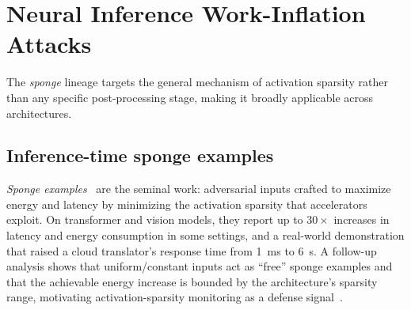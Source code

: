 \documentclass[acmsmall,screen,review,nonacm]{acmart}
\begin{document}

\section{Neural Inference Work-Inflation Attacks}
\label{sec:sponge}

The \emph{sponge} lineage targets the general mechanism of activation sparsity rather than any specific post-processing stage, making it broadly applicable across architectures.

\subsection{Inference-time sponge examples}
\emph{Sponge examples}~\cite{shumailov2021sponge} are the seminal work: adversarial inputs crafted to maximize energy and latency by minimizing the activation sparsity that accelerators exploit. On transformer and vision models, they report up to $30\times$ increases in latency and energy consumption in some settings, and a real-world demonstration that raised a cloud translator's response time from 1~ms to 6~s. A follow-up analysis shows that uniform/constant inputs act as ``free'' sponge examples and that the achievable energy increase is bounded by the architecture's sparsity range, motivating activation-sparsity monitoring as a defense signal~\cite{muller2024uniform}.
\end{document}
